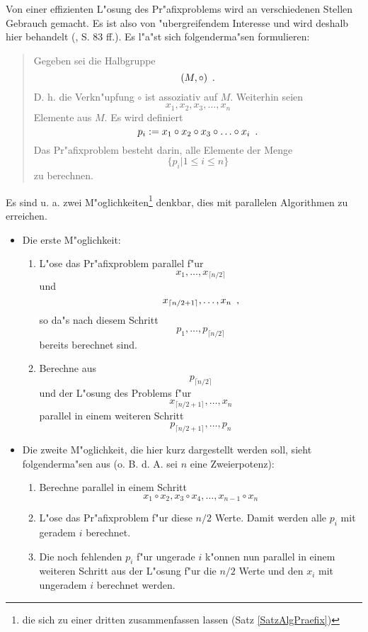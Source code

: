 
Von einer effizienten L"osung des Pr"afixproblems wird an verschiedenen
Stellen Gebrauch gemacht. Es ist also von "ubergreifendem Interesse und
wird deshalb hier behandelt (\cite{LF80},
\cite{Wege89} S. 83 ff.). Es l"a"st sich folgenderma"sen formulieren:
\begin{quote}
\label{PagePraefixproblem}
    Gegeben sei die Halbgruppe \[ (M,\circ) \mbox{\hspace{0.5em}.} \] 
    D. h. die Verkn"upfung 
    $\circ$ ist assoziativ auf $M$. Weiterhin seien 
    \[ x_1,x_2,x_3,\ldots,x_{n} \]
    Elemente aus $M$. Es wird definiert
    \[ p_i := x_1 \circ x_2 \circ x_3 \circ \ldots \circ x_i \mbox{\hspace{0.5em}.} \]
    Das Pr"afixproblem besteht darin, alle Elemente der Menge
    \[ \{ p_i | 1 \leq i \leq n \} \] zu berechnen.
\end{quote}
Es sind u. a. zwei M"oglichkeiten\footnote{die sich zu einer dritten 
zusammenfassen lassen (Satz \ref{SatzAlgPraefix})} denkbar, dies mit 
parallelen Algorithmen zu erreichen.
\begin{itemize}
    \item Die erste M"oglichkeit:
        \begin{enumerate}
            \item L"ose das Pr"afixproblem parallel f"ur
                  \[ x_1,\ldots,x_{\lceil n/2 \rceil} \]
                  und
                  \[ x_{\lceil n/2+1 \rceil},\ldots,x_n \mbox{\hspace{0.5em},} \]
                  so da"s nach diesem Schritt
                  \[ p_1,\ldots,p_{\lceil n/2 \rceil} \]
                  bereits berechnet sind.
            \item
                  Berechne aus \[ p_{\lceil n/2 \rceil} \] und
                  der L"osung des Problems f"ur
                  \[ x_{\lceil n/2+1 \rceil},\ldots,x_n \]
                  parallel in einem weiteren Schritt
                  \[ p_{\lceil n/2+1 \rceil},\ldots,p_n \]
        \end{enumerate}
    \item
        Die zweite M"oglichkeit, die hier kurz dargestellt werden soll,
        sieht folgenderma"sen aus (o. B. d. A. sei $n$ eine Zweierpotenz):
        \begin{enumerate}
            \item
                Berechne parallel in einem Schritt
                \[ x_1 \circ x_2, x_3 \circ x_4, \ldots,
                   x_{n-1} \circ x_n \]
            \item
                L"ose das Pr"afixproblem f"ur diese
                $n/2$ Werte. Damit werden alle $p_i$ mit geradem $i$
                berechnet.
            \item
                Die noch fehlenden $p_i$ f"ur ungerade $i$ k"onnen nun
                parallel in einem weiteren Schritt aus der L"osung f"ur die
                $n/2$ Werte und den $x_i$ mit ungeradem $i$ berechnet
                werden.
        \end{enumerate}
\end{itemize}
